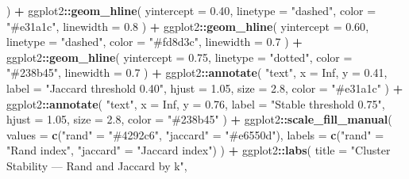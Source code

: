 \documentclass[
]{article}
\newenvironment{Shaded}{\begin{snugshade}}{\end{snugshade}}
\newcommand{\AttributeTok}[1]{\textcolor[rgb]{0.13,0.29,0.53}{#1}}
\newcommand{\ConstantTok}[1]{\textcolor[rgb]{0.56,0.35,0.01}{#1}}
\newcommand{\FloatTok}[1]{\textcolor[rgb]{0.00,0.00,0.81}{#1}}
\newcommand{\FunctionTok}[1]{\textcolor[rgb]{0.13,0.29,0.53}{\textbf{#1}}}
\newcommand{\NormalTok}[1]{#1}
\newcommand{\OtherTok}[1]{\textcolor[rgb]{0.56,0.35,0.01}{#1}}
\newcommand{\SpecialCharTok}[1]{\textcolor[rgb]{0.81,0.36,0.00}{\textbf{#1}}}
\newcommand{\StringTok}[1]{\textcolor[rgb]{0.31,0.60,0.02}{#1}}
\begin{document}
\begin{Shaded}
\begin{Highlighting}[]
\NormalTok{  ) }\SpecialCharTok{+}
\NormalTok{  ggplot2}\SpecialCharTok{::}\FunctionTok{geom\_hline}\NormalTok{(}
    \AttributeTok{yintercept =} \FloatTok{0.40}\NormalTok{, }\AttributeTok{linetype =} \StringTok{"dashed"}\NormalTok{,}
    \AttributeTok{color =} \StringTok{"\#e31a1c"}\NormalTok{, }\AttributeTok{linewidth =} \FloatTok{0.8}
\NormalTok{  ) }\SpecialCharTok{+}
\NormalTok{  ggplot2}\SpecialCharTok{::}\FunctionTok{geom\_hline}\NormalTok{(}
    \AttributeTok{yintercept =} \FloatTok{0.60}\NormalTok{, }\AttributeTok{linetype =} \StringTok{"dashed"}\NormalTok{,}
    \AttributeTok{color =} \StringTok{"\#fd8d3c"}\NormalTok{, }\AttributeTok{linewidth =} \FloatTok{0.7}
\NormalTok{  ) }\SpecialCharTok{+}
\NormalTok{  ggplot2}\SpecialCharTok{::}\FunctionTok{geom\_hline}\NormalTok{(}
    \AttributeTok{yintercept =} \FloatTok{0.75}\NormalTok{, }\AttributeTok{linetype =} \StringTok{"dotted"}\NormalTok{,}
    \AttributeTok{color =} \StringTok{"\#238b45"}\NormalTok{, }\AttributeTok{linewidth =} \FloatTok{0.7}
\NormalTok{  ) }\SpecialCharTok{+}
\NormalTok{  ggplot2}\SpecialCharTok{::}\FunctionTok{annotate}\NormalTok{(}
    \StringTok{"text"}\NormalTok{, }\AttributeTok{x =} \ConstantTok{Inf}\NormalTok{, }\AttributeTok{y =} \FloatTok{0.41}\NormalTok{,}
    \AttributeTok{label =} \StringTok{"Jaccard threshold 0.40"}\NormalTok{,}
    \AttributeTok{hjust =} \FloatTok{1.05}\NormalTok{, }\AttributeTok{size =} \FloatTok{2.8}\NormalTok{, }\AttributeTok{color =} \StringTok{"\#e31a1c"}
\NormalTok{  ) }\SpecialCharTok{+}
\NormalTok{  ggplot2}\SpecialCharTok{::}\FunctionTok{annotate}\NormalTok{(}
    \StringTok{"text"}\NormalTok{, }\AttributeTok{x =} \ConstantTok{Inf}\NormalTok{, }\AttributeTok{y =} \FloatTok{0.76}\NormalTok{,}
    \AttributeTok{label =} \StringTok{"Stable threshold 0.75"}\NormalTok{,}
    \AttributeTok{hjust =} \FloatTok{1.05}\NormalTok{, }\AttributeTok{size =} \FloatTok{2.8}\NormalTok{, }\AttributeTok{color =} \StringTok{"\#238b45"}
\NormalTok{  ) }\SpecialCharTok{+}
\NormalTok{  ggplot2}\SpecialCharTok{::}\FunctionTok{scale\_fill\_manual}\NormalTok{(}
    \AttributeTok{values =} \FunctionTok{c}\NormalTok{(}\StringTok{"rand"} \OtherTok{=} \StringTok{"\#4292c6"}\NormalTok{, }\StringTok{"jaccard"} \OtherTok{=} \StringTok{"\#e6550d"}\NormalTok{),}
    \AttributeTok{labels =} \FunctionTok{c}\NormalTok{(}\StringTok{"rand"} \OtherTok{=} \StringTok{"Rand index"}\NormalTok{, }\StringTok{"jaccard"} \OtherTok{=} \StringTok{"Jaccard index"}\NormalTok{)}
\NormalTok{  ) }\SpecialCharTok{+}
\NormalTok{  ggplot2}\SpecialCharTok{::}\FunctionTok{labs}\NormalTok{(}
    \AttributeTok{title    =} \StringTok{"Cluster Stability — Rand and Jaccard by k"}\NormalTok{,}

\end{Highlighting}
\end{Shaded}
\end{document}

